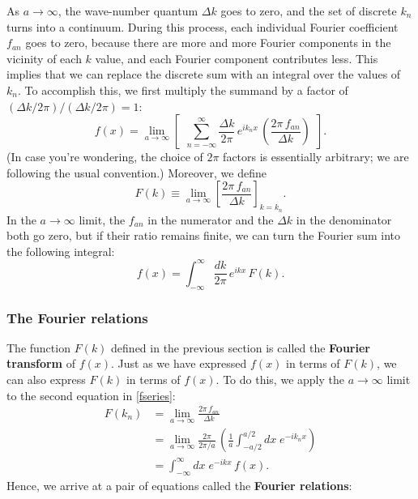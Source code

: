 \documentclass[10pt,a4paper]{article}
\begin{document}
As $a \rightarrow \infty$, the wave-number quantum $\Delta k$ goes to
zero, and the set of discrete $k_n$ turns into a continuum. During
this process, each individual Fourier coefficient $f_{an}$ goes to
zero, because there are more and more Fourier components in the
vicinity of each $k$ value, and each Fourier component contributes
less. This implies that we can replace the discrete sum with an
integral over the values of $k_n$. To accomplish this, we first
multiply the summand by a factor of $(\Delta k/2\pi) / (\Delta k/2\pi)
= 1$:
\begin{equation}
f(x) = \lim_{a\rightarrow \infty} \left[\;\,\sum_{n=-\infty}^\infty \frac{\Delta k}{2\pi} \, e^{i k_n x}\, \left(\frac{2\pi \,f_{an}}{\Delta k} \right)\;\,\right].
\end{equation}
(In case you're wondering, the choice of $2\pi$ factors is essentially
arbitrary; we are following the usual convention.) Moreover, we define
\begin{equation}
F(k) \equiv \lim_{a \rightarrow \infty} \left[\frac{2\pi\, f_{an}}{\Delta k}\right]_{k = k_n}.
\end{equation}
In the $a \rightarrow \infty$ limit, the $f_{an}$ in the numerator
and the $\Delta k$ in the denominator both go zero, but if their ratio
remains finite, we can turn the Fourier sum into the following integral:
\begin{equation}
f(x) = \int_{-\infty}^{\infty} \frac{dk}{2\pi} \, e^{i k x}\, F(k).
\end{equation}

\subsubsection{The Fourier relations}\label{the-fourier-relations}

The function $F(k)$ defined in the previous section is called the
\textbf{Fourier transform} of $f(x)$. Just as we have expressed $f(x)$
in terms of $F(k)$, we can also express $F(k)$ in terms of $f(x)$. To
do this, we apply the $a \rightarrow \infty$ limit to the second
equation in \eqref{fseries}:
\begin{align}
  F(k_n) &= \lim_{a\rightarrow \infty} \frac{2 \pi\, f_{an}}{\Delta k} \\
 &= \lim_{a\rightarrow \infty} \frac{2 \pi}{2\pi/a}\, \left(\frac{1}{a} \int_{-a/2}^{a/2} dx\; e^{-i k_n x}\right) \\
  &= \int_{-\infty}^\infty dx\; e^{-i kx}\, f(x).
\end{align}
Hence, we arrive at a pair of equations called the \textbf{Fourier
relations}:
\end{document}
